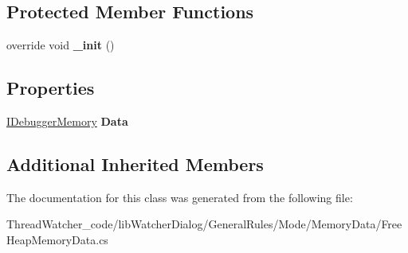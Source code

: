\subsection*{Protected Member Functions}
\begin{DoxyCompactItemize}
\item 
\hypertarget{classlib_watcher_dialog_1_1_general_rules_1_1_mode_1_1_memory_data_1_1_free_heap_memory_data_ae6cdb83d5a26b0c646782f3607ba61c2}{override void {\bfseries \+\_\+init} ()}\label{classlib_watcher_dialog_1_1_general_rules_1_1_mode_1_1_memory_data_1_1_free_heap_memory_data_ae6cdb83d5a26b0c646782f3607ba61c2}

\end{DoxyCompactItemize}
\subsection*{Properties}
\begin{DoxyCompactItemize}
\item 
\hypertarget{classlib_watcher_dialog_1_1_general_rules_1_1_mode_1_1_memory_data_1_1_free_heap_memory_data_a968699aefd45679e7ab0fcd20b5ce3cf}{\hyperlink{interfacelib_utilities_1_1_i_debugger_memory}{I\+Debugger\+Memory} {\bfseries Data}}\label{classlib_watcher_dialog_1_1_general_rules_1_1_mode_1_1_memory_data_1_1_free_heap_memory_data_a968699aefd45679e7ab0fcd20b5ce3cf}

\end{DoxyCompactItemize}
\subsection*{Additional Inherited Members}


The documentation for this class was generated from the following file\+:\begin{DoxyCompactItemize}
\item 
Thread\+Watcher\+\_\+code/lib\+Watcher\+Dialog/\+General\+Rules/\+Mode/\+Memory\+Data/Free\+Heap\+Memory\+Data.\+cs\end{DoxyCompactItemize}
